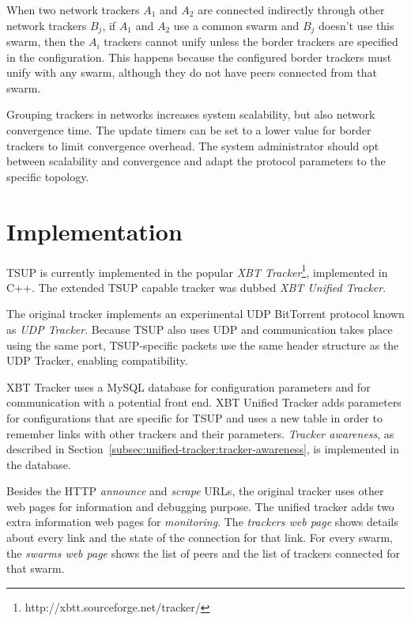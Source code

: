 When two network trackers $A_{1}$ and $A_{2}$ are connected indirectly through
other network trackers $B_{j}$, if $A_{1}$ and $A_{2}$ use a common swarm and
$B_{j}$ doesn't use this swarm, then the $A_{i}$ trackers cannot unify unless
the border trackers are specified in the configuration. This happens because
the configured border trackers must unify with any swarm, although they do not
have peers connected from that swarm.

Grouping trackers in networks increases system scalability, but also network
convergence time. The update timers can be set to a lower value for border
trackers to limit convergence overhead.  The system administrator should opt
between scalability and convergence and adapt the protocol parameters to the
specific topology.

\section{Implementation}
\label{sec:unified-tracker:implementation}

TSUP is currently implemented in the popular \textit{XBT
Tracker}\footnote{http://xbtt.sourceforge.net/tracker/}, implemented in C++.
The extended TSUP capable tracker was dubbed \textit{XBT Unified Tracker}.

The original tracker implements an experimental UDP BitTorrent protocol
known as \textit{UDP Tracker}. Because TSUP also uses UDP and communication
takes place using the same port, TSUP-specific packets use the same header
structure as the UDP Tracker, enabling compatibility.

XBT Tracker uses a MySQL database for configuration parameters and for
communication with a potential front end. XBT Unified Tracker adds parameters
for configurations that are specific for TSUP and uses a new table in order to
remember links with other trackers and their parameters.  \textit{Tracker
awareness}, as described in
Section~\ref{subsec:unified-tracker:tracker-awareness}, is implemented in the
database.

Besides the HTTP \textit{announce} and \textit{scrape} URLs, the original
tracker uses other web pages for information and debugging purpose. The
unified tracker adds two extra information web pages for \textit{monitoring}.
The \textit{trackers web page} shows details about every link and the state of
the connection for that link. For every swarm, the \textit{swarms web page}
shows the list of peers and the list of trackers connected for that swarm.

